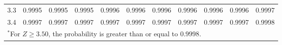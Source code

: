 \begin{table}[p]
\begin{center}
{\begin{tabular}{c | rrrrr | rrrrr |}
  3.3 & \footnotesize{0.9995} & \footnotesize{0.9995} & \footnotesize{0.9995} & \footnotesize{0.9996} & \footnotesize{0.9996} & \footnotesize{0.9996} & \footnotesize{0.9996} & \footnotesize{0.9996} & \footnotesize{0.9996} & \footnotesize{0.9997} \\
  3.4 & \footnotesize{0.9997} & \footnotesize{0.9997} & \footnotesize{0.9997} & \footnotesize{0.9997} & \footnotesize{0.9997} & \footnotesize{0.9997} & \footnotesize{0.9997} & \footnotesize{0.9997} & \footnotesize{0.9997} & \footnotesize{0.9998} \\
   \hline
\multicolumn{11}{l}{{\normalsize$^*$For $Z \geq 3.50$, the probability is greater than or equal to $0.9998$.}}
\end{tabular}}
\end{center}
\end{table}
